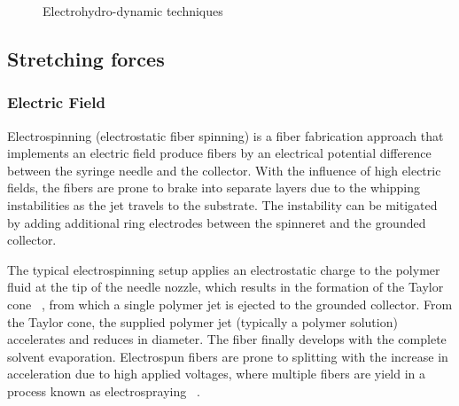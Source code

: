\bgroup
\begin{figure}[!htbp]
\centering \makeatletter{}
\makeatother 
\caption{{Electrohydro-dynamic techniques}}
\label{f-02e0e3cf88d6}
\end{figure}
\egroup

\subsection{Stretching forces}

\subsubsection{Electric Field}Electrospinning (electrostatic fiber spinning) is a fiber fabrication approach that implements an electric field produce fibers by an electrical potential difference between the syringe needle and the collector. With the influence of high electric fields, the fibers are prone to brake into separate layers due to the whipping instabilities as the jet travels to the substrate. The instability can be mitigated by adding additional ring electrodes between the spinneret and the grounded collector. \unskip~\cite{527120:13915304}

The typical electrospinning setup applies an electrostatic charge to the polymer fluid at the tip of the needle nozzle, which results in the formation of the Taylor cone \unskip~\cite{527120:13659828}, from which a single polymer jet is ejected to the grounded collector. From the Taylor cone, the supplied polymer jet (typically a polymer solution) accelerates and reduces in diameter. The fiber finally develops with the complete solvent evaporation. Electrospun fibers are prone to splitting with the increase in acceleration due to high applied voltages, where multiple fibers are yield in a process known as electrospraying \unskip~\cite{527120:13659925}.

